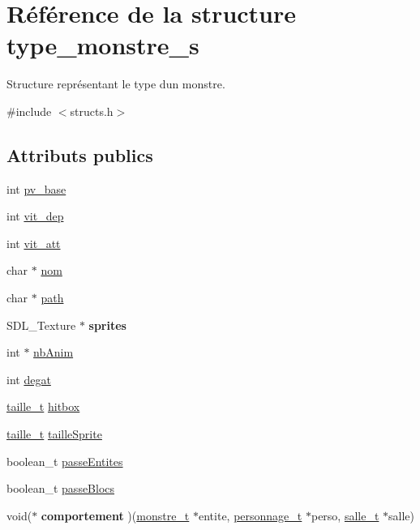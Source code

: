 \hypertarget{structtype__monstre__s}{}\section{Référence de la structure type\+\_\+monstre\+\_\+s}
\label{structtype__monstre__s}


Structure représentant le type d\textquotesingle{}un monstre.  




{\ttfamily \#include $<$structs.\+h$>$}

\subsection*{Attributs publics}
\begin{DoxyCompactItemize}
\item 
int \hyperlink{structtype__monstre__s_a37d1cae3dfb8de6ce15f2601a93cd1cc}{pv\+\_\+base}
\item 
int \hyperlink{structtype__monstre__s_a768470695da3d9377f1e7e97a3c45ed7}{vit\+\_\+dep}
\item 
int \hyperlink{structtype__monstre__s_a5bb66d5b722fc97f901c5eaf7d621fd4}{vit\+\_\+att}
\item 
char $\ast$ \hyperlink{structtype__monstre__s_a18520dadfa451022be8dd63b86a1943c}{nom}
\item 
char $\ast$ \hyperlink{structtype__monstre__s_ad507cb527c078d7a5c565b67d842e968}{path}
\item 
\mbox{\label{structtype__monstre__s_ac1a86f0c67aba51892c613210e3de1be}} 
S\+D\+L\+\_\+\+Texture $\ast$ {\bfseries sprites}
\item 
int $\ast$ \hyperlink{structtype__monstre__s_aecf18b6fa00e710fe27de2d1b738e62c}{nb\+Anim}
\item 
int \hyperlink{structtype__monstre__s_aa3e5568720dc977348e6929f3df5260c}{degat}
\item 
\hyperlink{structtaille__s}{taille\+\_\+t} \hyperlink{structtype__monstre__s_ac0afaa340c029c12a6939d4b09fd3966}{hitbox}
\item 
\hyperlink{structtaille__s}{taille\+\_\+t} \hyperlink{structtype__monstre__s_a2b2b4110520736e30d3a4853a9876469}{taille\+Sprite}
\item 
boolean\+\_\+t \hyperlink{structtype__monstre__s_a03f34ddaadae9f002130e70844f142f1}{passe\+Entites}
\item 
boolean\+\_\+t \hyperlink{structtype__monstre__s_a0f60370f9ae95fff9ab024fbf6485df6}{passe\+Blocs}
\item 
\mbox{\label{structtype__monstre__s_a2ca7834d71e7589f5fefcbf503d1351d}} 
void($\ast$ {\bfseries comportement} )(\hyperlink{structmonstre__s}{monstre\+\_\+t} $\ast$entite, \hyperlink{structpersonnage__s}{personnage\+\_\+t} $\ast$perso, \hyperlink{structsalle__s}{salle\+\_\+t} $\ast$salle)
\end{DoxyCompactItemize}



